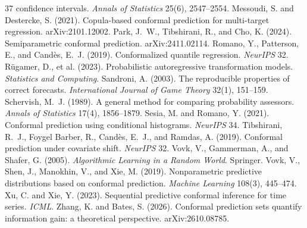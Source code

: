\documentclass[11pt]{article}
\theoremstyle{remark}
\begin{document}
\begin{thebibliography}{37}
  confidence intervals. \emph{Annals of Statistics} 25(6), 2547--2554.
 Messoudi, S. and
  Destercke, S. (2021). Copula-based conformal prediction for multi-target
  regression. arXiv:2101.12002.
 Park, J.~W., Tibshirani, R.,
  and Cho, K. (2024). Semiparametric conformal prediction. arXiv:2411.02114.
 Romano, Y., Patterson, E.,
  and Cand\`es, E.~J. (2019). Conformalized quantile regression. \emph{NeurIPS} 32.
 R\"ugamer, D., et al. (2023).
  Probabilistic autoregressive transformation models. \emph{Statistics and
  Computing}.
 Sandroni, A. (2003). The reproducible properties
  of correct forecasts. \emph{International Journal of Game Theory} 32(1), 151--159.
 Schervish, M.~J. (1989). A general method for
  comparing probability assessors. \emph{Annals of Statistics} 17(4), 1856--1879.
 Sesia, M. and Romano, Y. (2021).
  Conformal prediction using conditional histograms. \emph{NeurIPS} 34.
 Tibshirani, R.~J.,
  Foygel Barber, R., Cand\`es, E.~J., and Ramdas, A. (2019). Conformal
  prediction under covariate shift. \emph{NeurIPS} 32.
 Vovk, V., Gammerman, A., and
  Shafer, G. (2005). \emph{Algorithmic Learning in a Random World}. Springer.
 Vovk, V., Shen, J., Manokhin, V.,
  and Xie, M. (2019). Nonparametric predictive distributions based on conformal
  prediction. \emph{Machine Learning} 108(3), 445--474.
 Xu, C. and Xie, Y. (2023). Sequential
  predictive conformal inference for time series. \emph{ICML}.
 Zhang, K. and Bates, S. (2026). Conformal prediction
  sets quantify information gain: a theoretical perspective. arXiv:2610.08785.
\end{thebibliography}
\end{document}

